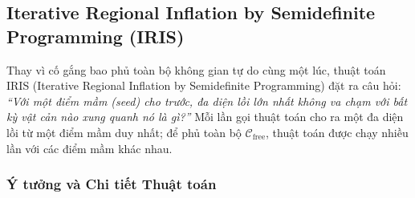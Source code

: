 \subsection{Iterative Regional Inflation by Semidefinite Programming (IRIS)}

Thay vì cố gắng bao phủ toàn bộ không gian tự do cùng một lúc, thuật toán IRIS (Iterative Regional Inflation by Semidefinite Programming) đặt ra câu hỏi: \textit{``Với một điểm mầm (seed) cho trước, đa diện lồi lớn nhất không va chạm với bất kỳ vật cản nào xung quanh nó là gì?''} Mỗi lần gọi thuật toán cho ra một đa diện lồi từ một điểm mầm duy nhất; để phủ toàn bộ $\mathcal{C}_{\mathrm{free}}$, thuật toán được chạy nhiều lần với các điểm mầm khác nhau.

\subsubsection{Ý tưởng và Chi tiết Thuật toán}

